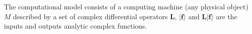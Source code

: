 \documentclass{article}
\begin{document}
The computational model consists of a computing machine (any physical object) $M$ described by a set of complex differential operators $\bm{L}$, $|\bm{f}\rangle$ and $\bm{L}|\bm{f}\rangle$ are the inputs and outputs analytic complex functions.

\begin{center}
\end{center}
\end{document}
